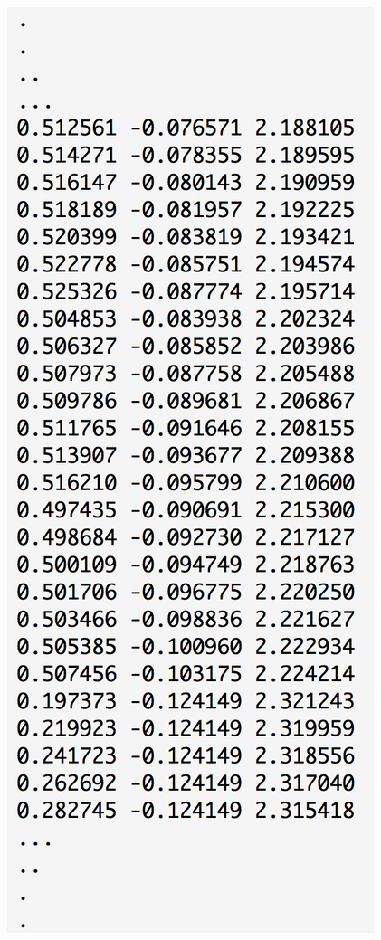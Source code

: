 \documentclass[11pt]{article}
\begin{document}
\begin{center}
\includegraphics[width=.9\linewidth]{./images/Presentation_car_computervision.png}
\end{center}
\end{document}
